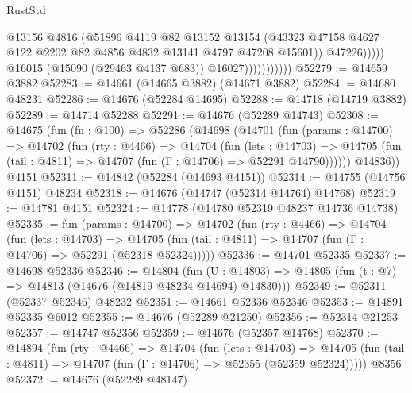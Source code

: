 \begin{lexlean}{RustStd}
\begin{coremodule}
                                    @13156
                                    @4816
                                    (@51896
                                      @4119
                                      @82
                                      @13152
                                      @13154
                                      (@43323
                                        @47158
                                        @4627
                                        @122
                                        @2202
                                        @82
                                        @4856
                                        @4832
                                        @13141
                                        @4797
                                        @47208
                                        @15601))
                                    @47226)))))
                          @16015
                          (@15090 (@29463 @4137 @683))
                          @16027)))))))))))
@52279 := @14659 @3882
@52283 := @14661 (@14665 @3882) (@14671 @3882)
@52284 := @14680 @48231
@52286 := @14676 (@52284 @14695)
@52288 := @14718 (@14719 @3882)
@52289 := @14714 @52288
@52291 := @14676 (@52289 @14743)
@52308 := @14675
    (fun (fn : @100) =>
    @52286
      (@14698
        (@14701
          (fun (params : @14700) =>
          @14702
            (fun (rty : @4466) =>
            @14704
              (fun (lets : @14703) =>
              @14705 (fun (tail : @4811) => @14707 (fun (Γ : @14706) => @52291 @14790))))))
        @14836))
    @4151
@52311 := @14842 (@52284 (@14693 @4151))
@52314 := @14755 (@14756 @4151) @48234
@52318 := @14676 (@14747 (@52314 @14764) @14768)
@52319 := @14781 @4151
@52324 := @14778 (@14780 @52319 @48237 @14736 @14738)
@52335 := fun (params : @14700) =>
  @14702
    (fun (rty : @4466) =>
    @14704
      (fun (lets : @14703) =>
      @14705 (fun (tail : @4811) => @14707 (fun (Γ : @14706) => @52291 (@52318 @52324)))))
@52336 := @14701 @52335
@52337 := @14698 @52336
@52346 := @14804
    (fun (U : @14803) => @14805 (fun (t : @7) => @14813 (@14676 (@14819 @48234 @14694) @14830)))
@52349 := @52311 (@52337 @52346) @48232
@52351 := @14661 @52336 @52346
@52353 := @14891 @52335 @6012
@52355 := @14676 (@52289 @21250)
@52356 := @52314 @21253
@52357 := @14747 @52356
@52359 := @14676 (@52357 @14768)
@52370 := @14894
    (fun (rty : @4466) =>
    @14704
      (fun (lets : @14703) =>
      @14705 (fun (tail : @4811) => @14707 (fun (Γ : @14706) => @52355 (@52359 @52324)))))
    @8356
@52372 := @14676 (@52289 @48147)

\end{coremodule}
\end{lexlean}
